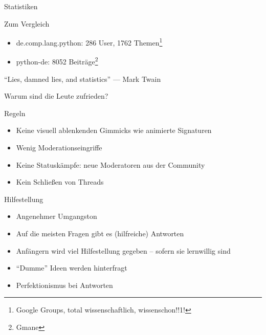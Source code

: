 \documentclass{beamer}
\begin{document}
\begin{frame}{Statistiken}
  \begin{block}{Zum Vergleich}
    \begin{itemize}
      \item de.comp.lang.python: 286 User, 1762 Themen\footnote{Google Groups, total
        wissenschaftlich, wissenschon!!1!}
      \item python-de: 8052 Beiträge\footnote{Gmane}
    \end{itemize}
  \end{block}
  \enquote{Lies, damned lies, and statistics} — Mark Twain
\end{frame}

\begin{frame}{Warum sind die Leute zufrieden?}
  \begin{block}{Regeln}
    \begin{itemize}
      \item Keine visuell ablenkenden Gimmicks wie animierte Signaturen
      \item Wenig Moderationseingriffe
      \item Keine Statuskämpfe: neue Moderatoren aus der Community
      \item Kein Schließen von Threads
    \end{itemize}
  \end{block}
  \begin{block}{Hilfestellung}
    \begin{itemize}
      \item Angenehmer Umgangston
      \item Auf die meisten Fragen gibt es (hilfreiche) Antworten
      \item Anfängern wird viel Hilfestellung gegeben – sofern sie lernwillig sind
      \item \enquote{Dumme} Ideen werden hinterfragt
      \item Perfektionismus bei Antworten
    \end{itemize}
  \end{block}
\end{frame}
\end{document}
